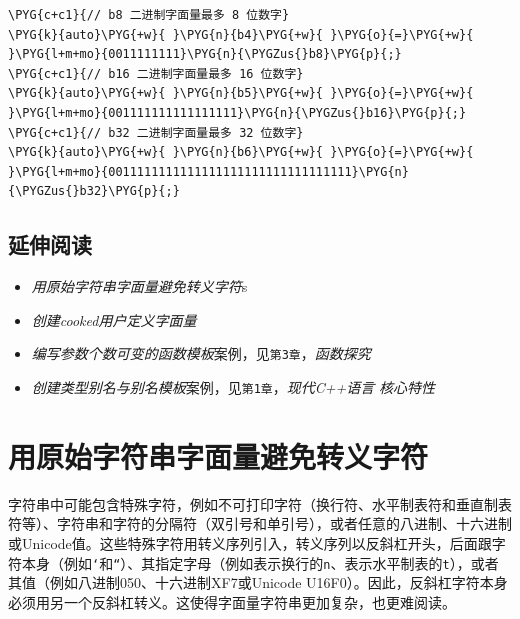 \begin{codeblockbg}
\begin{Verbatim}[commandchars=\\\{\},breaklines=true,breakanywhere=true,fontsize=\codefont,xleftmargin=17bp]
\PYG{c+c1}{// b8 二进制字面量最多 8 位数字}
\PYG{k}{auto}\PYG{+w}{ }\PYG{n}{b4}\PYG{+w}{ }\PYG{o}{=}\PYG{+w}{ }\PYG{l+m+mo}{0011111111}\PYG{n}{\PYGZus{}b8}\PYG{p}{;}
\PYG{c+c1}{// b16 二进制字面量最多 16 位数字}
\PYG{k}{auto}\PYG{+w}{ }\PYG{n}{b5}\PYG{+w}{ }\PYG{o}{=}\PYG{+w}{ }\PYG{l+m+mo}{001111111111111111}\PYG{n}{\PYGZus{}b16}\PYG{p}{;}
\PYG{c+c1}{// b32 二进制字面量最多 32 位数字}
\PYG{k}{auto}\PYG{+w}{ }\PYG{n}{b6}\PYG{+w}{ }\PYG{o}{=}\PYG{+w}{ }\PYG{l+m+mo}{0011111111111111111111111111111111}\PYG{n}{\PYGZus{}b32}\PYG{p}{;}
\end{Verbatim}
\end{codeblockbg}



\subsection{延伸阅读}



\begin{itemize}
\item \textit{用原始字符串字面量避免转义字符}s



\item \textit{创建cooked用户定义字面量}



\item \textit{编写参数个数可变的函数模板}案例，见\texttt{第3章}，\textit{函数探究}



\item \textit{创建类型别名与别名模板}案例，见\texttt{第1章}，\textit{现代C++语言} \textit{核心特性}


\end{itemize}



\section{用原始字符串字面量避免转义字符}



字符串中可能包含特殊字符，例如不可打印字符（换行符、水平制表符和垂直制表符等）、字符串和字符的分隔符（双引号和单引号），或者任意的八进制、十六进制或Unicode值。这些特殊字符用转义序列引入，转义序列以反斜杠开头，后面跟字符本身（例如\texttt{‘}和\texttt{“}）、其指定字母（例如表示换行的\texttt{n}、表示水平制表的\texttt{t}），或者其值（例如八进制050、十六进制XF7或Unicode U16F0）。因此，反斜杠字符本身必须用另一个反斜杠转义。这使得字面量字符串更加复杂，也更难阅读。


